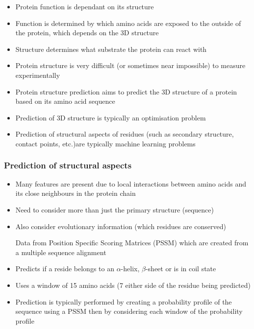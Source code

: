 \documentclass[a4paper]{article}
\begin{document}
\begin{itemize}
  \item
    Protein function is dependant on its structure

  \item
    Function is determined by which amino acids are exposed to the outside of
    the protein, which depends on the 3D structure

  \item
    Structure determines what substrate the protein can react with

  \item
    Protein structure is very difficult (or sometimes near impossible) to
    measure experimentally

  \item
    Protein structure prediction aims to predict the 3D structure of a protein
    based on its amino acid sequence

  \item
    Prediction of 3D structure is typically an optimisation problem

  \item
    Prediction of structural aspects of residues (such as secondary structure,
    contact points, etc.)are typically machine learning problems
\end{itemize}

\subsubsection{Prediction of structural aspects}

\begin{itemize}
  \item
    Many features are present due to local interactions between amino acids and
    its close neighbours in the protein chain

  \item
    Need to consider more than just the primary structure (sequence)

  \item
    Also consider evolutionary information (which residues are conserved)

    Data from Position Specific Scoring Matrices (PSSM) which are created from a
    multiple sequence alignment
\end{itemize}


\begin{itemize}
  \item
    Predicts if a reside belongs to an $\alpha$-helix, $\beta$-sheet or is in
    coil state

  \item
    Uses a window of 15 amino acids (7 either side of the residue being
    predicted)

  \item
    Prediction is typically performed by creating a probability profile of the
    sequence using a PSSM then by considering each window of the probability
    profile
\end{itemize}
\end{document}

